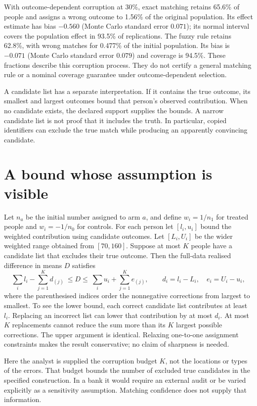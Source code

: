 With outcome-dependent corruption at 30\%, exact matching retains 65.6\%
of people and assigns a wrong outcome to 1.56\% of the original population.
Its effect estimate has bias $-0.560$ (Monte Carlo standard error $0.071$);
its normal interval covers the population effect in 93.5\% of replications.
The fuzzy rule retains 62.8\%, with wrong matches for 0.477\% of the initial
population. Its bias is $-0.071$ (Monte Carlo standard error $0.079$) and
coverage is 94.5\%. These fractions describe this corruption process.
They do not certify a general matching rule or a nominal coverage guarantee
under outcome-dependent selection.

A candidate list has a separate interpretation. If it contains the true
outcome, its smallest and largest outcomes bound that person's observed
contribution. When no candidate exists, the declared support supplies the
bounds. A narrow candidate list is not proof that it includes the truth.
In particular, copied identifiers can exclude the true match while producing
an apparently convincing candidate.

\section{A bound whose assumption is visible}
Let $n_a$ be the initial number assigned to arm $a$, and define
$w_i=1/n_1$ for treated people and $w_i=-1/n_0$ for controls.
For each person let $[l_i,u_i]$ bound the weighted contribution using candidate
outcomes. Let $[L_i,U_i]$ be the wider weighted range obtained from $[70,160]$.
Suppose at most $K$ people have a candidate list that excludes their true
outcome. Then the full-data realised difference in means $D$ satisfies
\[
 \sum_i l_i-\sum_{j=1}^{K} d_{(j)}
 \ \le D\le\
 \sum_i u_i+\sum_{j=1}^{K} e_{(j)},\qquad
 d_i=l_i-L_i,\quad e_i=U_i-u_i,
\]
where the parenthesised indices order the nonnegative corrections from
largest to smallest. To see the lower bound, each correct candidate list
contributes at least $l_i$. Replacing an incorrect list can lower that
contribution by at most $d_i$. At most $K$ replacements cannot reduce the sum
more than its $K$ largest possible corrections. The upper argument is
identical. Relaxing one-to-one assignment constraints makes the result
conservative; no claim of sharpness is needed.

Here the analyst is supplied the corruption budget $K$, not the locations
or types of the errors. That budget bounds the number of excluded true
candidates in the specified construction. In a bank it would require an
external audit or be varied explicitly as a sensitivity assumption.
Matching confidence does not supply that information.

